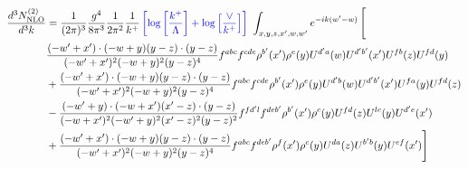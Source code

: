 \documentclass[aps,prd,amsmath,amssymb,nofootinbib]{revtex4-2}
\numberwithin{equation}{section}
\begin{document}
\begin{align}
    \frac{d^{3}N^{(2)}_{\rm NLO}}{d^{3}k} & = \frac{1}{(2\pi)^{3}}\frac{g^{4}}{8\pi^{3}}\frac{1}{2\pi^{2}} \frac{1}{k^{+}}\,{\color{blue}\left[\log{\left[\frac{k^{+}}{\Lambda}\right]}+\log{\left[\frac{\vee}{k^{+}}\right]}\right]}\,\,\int_{x,y,z,x^{\prime},w,w^{\prime}}e^{-ik(w^{\prime}-w)}\, \Bigg[\notag \\ &  \frac{( - w' + x') \cdot ( - w + y) (y - z) \cdot (y - z)}{( - w' + x')^{2} ( - w + y)^{2} (y - z)^{4}} f^{a b c} f^{c d e} \rho^{b'}(x') \rho^{e}(y) U^{d' a}(w) U^{d' b'}(x') U^{f b}(z) U^{f d}(y)\nonumber\\
        &+ \frac{( - w' + x') \cdot ( - w + y) (y - z) \cdot (y - z)}{( - w' + x')^{2} ( - w + y)^{2} (y - z)^{4}} f^{a b c} f^{c d e} \rho^{b'}(x') \rho^{e}(y) U^{d' b}(w) U^{d' b'}(x') U^{f a}(y) U^{f d}(z)\nonumber\\
    &- \frac{( - w' + y) \cdot ( - w + x') (x' - z) \cdot (y - z)}{( - w + x')^{2} ( - w' + y)^{2} (x' - z)^{2} (y - z)^{2}} f^{f d' l} f^{d e b'} \rho^{b'}(x') \rho^{c}(y) U^{fd}(z) U^{lc}(y) U^{d' e}(x')\nonumber\\
    & + \frac{( - w' + x') \cdot ( - w + y) (y - z) \cdot (y - z)}{( - w' + x')^{2} ( - w + y)^{2} (y - z)^{4}} f^{a b c} f^{d e b'} \rho^{f}(x') \rho^{c}(y) U^{da}(z) U^{b'b}(y) U^{e f}(x')\Bigg]
\end{align}
\end{document}
